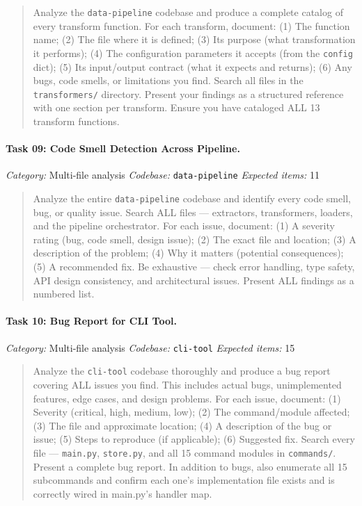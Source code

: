\begin{quote}
Analyze the \texttt{data-pipeline} codebase and produce a complete catalog of every transform function. For each transform, document: (1) The function name; (2) The file where it is defined; (3) Its purpose (what transformation it performs); (4) The configuration parameters it accepts (from the \texttt{config} dict); (5) Its input/output contract (what it expects and returns); (6) Any bugs, code smells, or limitations you find. Search all files in the \texttt{transformers/} directory. Present your findings as a structured reference with one section per transform. Ensure you have cataloged ALL 13 transform functions.
\end{quote}

\paragraph{Task 09: Code Smell Detection Across Pipeline.}
\textit{Category:} Multi-file analysis \quad
\textit{Codebase:} \texttt{data-pipeline} \quad
\textit{Expected items:} 11

\begin{quote}
Analyze the entire \texttt{data-pipeline} codebase and identify every code smell, bug, or quality issue. Search ALL files --- extractors, transformers, loaders, and the pipeline orchestrator. For each issue, document: (1) A severity rating (bug, code smell, design issue); (2) The exact file and location; (3) A description of the problem; (4) Why it matters (potential consequences); (5) A recommended fix. Be exhaustive --- check error handling, type safety, API design consistency, and architectural issues. Present ALL findings as a numbered list.
\end{quote}

\paragraph{Task 10: Bug Report for CLI Tool.}
\textit{Category:} Multi-file analysis \quad
\textit{Codebase:} \texttt{cli-tool} \quad
\textit{Expected items:} 15

\begin{quote}
Analyze the \texttt{cli-tool} codebase thoroughly and produce a bug report covering ALL issues you find. This includes actual bugs, unimplemented features, edge cases, and design problems. For each issue, document: (1) Severity (critical, high, medium, low); (2) The command/module affected; (3) The file and approximate location; (4) A description of the bug or issue; (5) Steps to reproduce (if applicable); (6) Suggested fix. Search every file --- \texttt{main.py}, \texttt{store.py}, and all 15 command modules in \texttt{commands/}. Present a complete bug report. In addition to bugs, also enumerate all 15 subcommands and confirm each one's implementation file exists and is correctly wired in main.py's handler map.
\end{quote}

